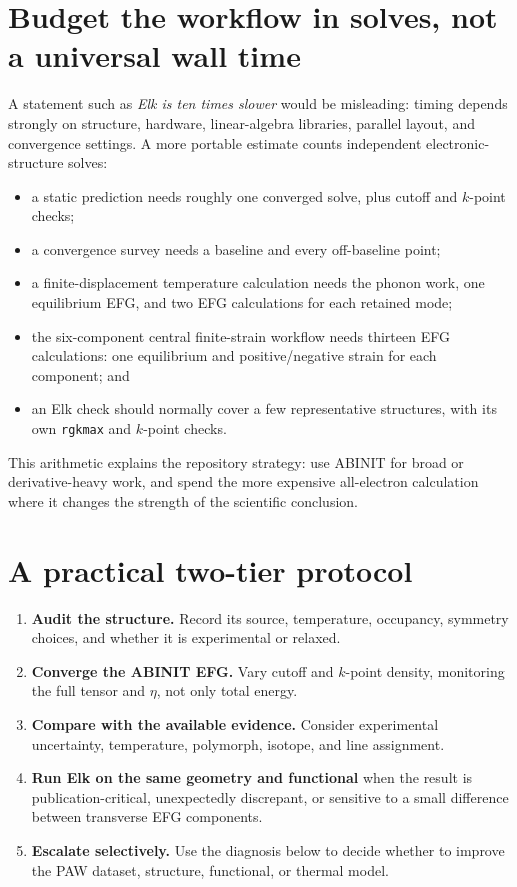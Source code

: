 \documentclass[11pt,oneside]{report}
\newcommand{\code}[1]{{\small\nolinkurl{#1}}}
\begin{document}
\section{Budget the workflow in solves, not a universal wall time}

A statement such as \emph{Elk is ten times slower} would be misleading: timing
depends strongly on structure, hardware, linear-algebra libraries, parallel
layout, and convergence settings. A more portable estimate counts independent
electronic-structure solves:
\begin{itemize}
  \item a static prediction needs roughly one converged solve, plus cutoff and
    $k$-point checks;
  \item a convergence survey needs a baseline and every off-baseline point;
  \item a finite-displacement temperature calculation needs the phonon work,
    one equilibrium EFG, and two EFG calculations for each retained mode;
  \item the six-component central finite-strain workflow needs thirteen EFG
    calculations: one equilibrium and positive/negative strain for each
    component; and
  \item an Elk check should normally cover a few representative structures,
    with its own \code{rgkmax} and $k$-point checks.
\end{itemize}
This arithmetic explains the repository strategy: use ABINIT for broad or
derivative-heavy work, and spend the more expensive all-electron calculation
where it changes the strength of the scientific conclusion.

\section{A practical two-tier protocol}

\begin{enumerate}
  \item \textbf{Audit the structure.} Record its source, temperature,
  occupancy, symmetry choices, and whether it is experimental or relaxed.
  \item \textbf{Converge the ABINIT EFG.} Vary cutoff and $k$-point density,
  monitoring the full tensor and $\eta$, not only total energy.
  \item \textbf{Compare with the available evidence.} Consider experimental
  uncertainty, temperature, polymorph, isotope, and line assignment.
  \item \textbf{Run Elk on the same geometry and functional} when the result is
  publication-critical, unexpectedly discrepant, or sensitive to a small
  difference between transverse EFG components.
  \item \textbf{Escalate selectively.} Use the diagnosis below to decide
  whether to improve the PAW dataset, structure, functional, or thermal model.
\end{enumerate}
\end{document}
